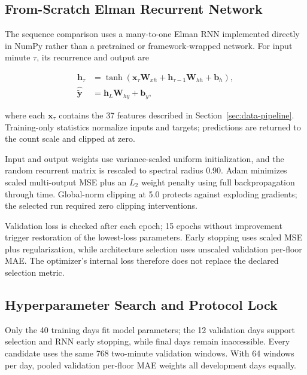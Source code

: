 \documentclass[12pt]{article}
\begin{document}
\subsection{From-Scratch Elman Recurrent Network}

The sequence comparison uses a many-to-one Elman RNN
\cite{elman1990structure} implemented directly in NumPy rather than a
pretrained or framework-wrapped network. For input minute
$\tau$, its recurrence and output are

\begin{align}
  \mathbf{h}_{\tau}
    &=\tanh\!\left(\mathbf{x}_{\tau}\mathbf{W}_{xh}
      +\mathbf{h}_{\tau-1}\mathbf{W}_{hh}+\mathbf{b}_{h}\right),
      \label{eq:rnn-hidden}\\
  \widehat{\widetilde{\mathbf{y}}}
    &=\mathbf{h}_{L}\mathbf{W}_{hy}+\mathbf{b}_{y},
      \label{eq:rnn-output}
\end{align}

where each $\mathbf{x}_{\tau}$ contains the 37 features described in
Section~\ref{sec:data-pipeline}. Training-only statistics normalize inputs and
targets; predictions are returned to the count scale and clipped at zero.

Input and output weights use variance-scaled uniform initialization, and the
random recurrent matrix is rescaled to spectral radius 0.90. Adam minimizes
scaled multi-output MSE plus an $L_2$ weight penalty using full backpropagation
through time. Global-norm clipping at 5.0 protects against exploding gradients;
the selected run required zero clipping interventions.

Validation loss is checked after each epoch; 15 epochs without improvement
trigger restoration of the lowest-loss parameters. Early stopping uses scaled
MSE plus regularization, while architecture selection uses unscaled validation
per-floor MAE. The optimizer's internal loss therefore does not replace the
declared selection metric.

\subsection{Hyperparameter Search and Protocol Lock}

Only the 40 training days fit model parameters; the 12 validation days support
selection and RNN early stopping, while final days remain inaccessible. Every
candidate uses the same 768 two-minute validation windows. With 64 windows per
day, pooled validation per-floor MAE weights all development days equally.
\end{document}
